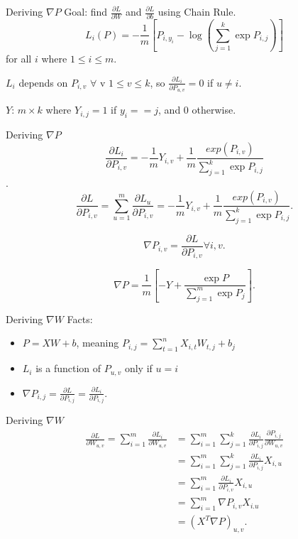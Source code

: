 \documentclass{beamer}
\begin{document}
  \begin{frame}{Deriving $\nabla P$}
    Goal: find $\frac{\partial L}{\partial W}$ and
    $\frac{\partial L}{\partial b}$ using Chain Rule.
    $$ L_i(P) = -\frac{1}{m} \left[ P_{i, y_i} - \log\left( \sum_{j=1}^k \exp
    P_{i, j} \right)\right] $$ for all $i$ where $1 \leq i \leq m$.

    $L_i$ depends on $P_{i, v}$ $\forall$ v $1 \leq v \leq k$,
    so $\frac{\partial L_i}{\partial P_{u, v}} = 0$ if $u \neq i$.

    $Y$: $m \times k$ where $Y_{i, j} = 1$ if $y_i == j$, and 0 otherwise.

  \end{frame}

  \begin{frame}{Deriving $\nabla P$}
    $$ \frac{\partial L_i}{\partial P_{i, v}} = -\frac{1}{m} Y_{i, v}
        + \frac{1}{m} \frac{exp(P_{i, v})}{\sum_{j=1}^k \exp P_{i, j}}$$.
    $$ \frac{\partial L}{\partial P_{i, v}} =
       \sum_{u=1}^m \frac{\partial L_u}{\partial P_{i, v}} =
       -\frac{1}{m} Y_{i, v} + \frac{1}{m} \frac{exp(P_{i, v})}{\sum_{j=1}^k
       \exp P_{i, j}}. $$

    $$ \nabla P_{i, v} = \frac{\partial L}{\partial P_{i, v}} \forall i, v.$$

    $$ \nabla P = \frac{1}{m} \left[ -Y + \frac{\exp P}{\sum_{j=1}^m \exp P_j}
       \right]. $$
  \end{frame}

  \begin{frame}{Deriving $\nabla W$}
    Facts:
    \begin{itemize}
      \item $P = XW + b$, meaning $P_{i, j} = \sum_{t=1}^n X_{i, t}W_{t, j} + b_j $
      \item $L_i$ is a function of $P_{u, v}$ only if $u = i$
      \item $\nabla P_{i, j} = \frac{\partial L}{\partial P_{i, j}} 
            = \frac{\partial L_i}{\partial P_{i, j}}$.
    \end{itemize}
  \end{frame}

  \begin{frame}{Deriving $\nabla W$}
    \begin{align*} 
         \frac{\partial L}{\partial W_{u, v}} = 
         \sum_{i=1}^m \frac{\partial L_i}{\partial W_{u, v}} &= 
         \sum_{i=1}^m \sum_{j=1}^k \frac{\partial L_i}{\partial P_{i, j}}
           \frac{\partial P_{i, j}}{\partial W_{u, v}}\\
         &= \sum_{i=1}^m \sum_{j=1}^k
             \frac{\partial L_i}{\partial P_{i, j}} X_{i, u}\\
         &= \sum_{i=1}^m \frac{\partial L_i}{\partial P_{i, v}} X_{i, u}\\ %
         &= \sum_{i=1}^m \nabla P_{i, v} X_{i. u}\\
         &= \left( X^T \nabla P \right)_{u, v}.
    \end{align*}

  \end{frame}
\end{document}

